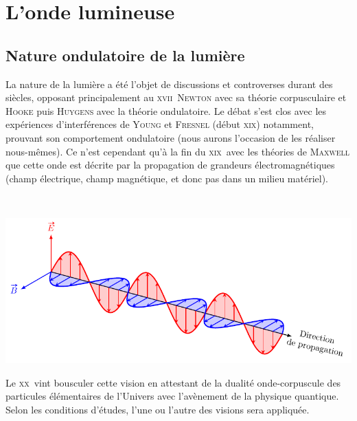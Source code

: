 \documentclass[../../main/main.tex]{subfiles}
\begin{document}
\section{L'onde lumineuse}

\subsection{Nature ondulatoire de la lumière}

\noindent
\begin{minipage}[t]{.48\linewidth}
	La nature de la lumière a été l'objet de discussions et controverses durant
	des siècles, opposant principalement au \textsc{xvii}\ieme\ \textsc{Newton}
	avec sa théorie corpusculaire et \textsc{Hooke} puis \textsc{Huygens} avec la
	théorie ondulatoire. Le débat s'est clos avec les expériences d'interférences
	de \textsc{Young} et \textsc{Fresnel} (début \textsc{xix}\ieme) notamment,
	prouvant son comportement ondulatoire (nous aurons l'occasion de les réaliser
	nous-mêmes).
	\smallbreak
	Ce n'est cependant qu'à la fin du \textsc{xix}\ieme\ avec les théories
	de \textsc{Maxwell} que cette onde est décrite par la propagation de grandeurs
	électromagnétiques (champ électrique, champ magnétique, et donc pas dans un
	milieu matériel).
\end{minipage}
\hfill
\begin{minipage}[t]{.48\linewidth}
	~
	\vspace*{-20pt}
	\begin{center}
		\includegraphics[width=\linewidth]{propagation}
		\label{fig:proplum}
	\end{center}
\end{minipage}
\bigbreak
Le \textsc{xx}\ieme\ vint bousculer cette vision en attestant de la dualité
onde-corpuscule des particules élémentaires de l'Univers avec l'avènement de la
physique quantique. Selon les conditions d'études, l'une ou l'autre des visions
sera appliquée.
\end{document}
